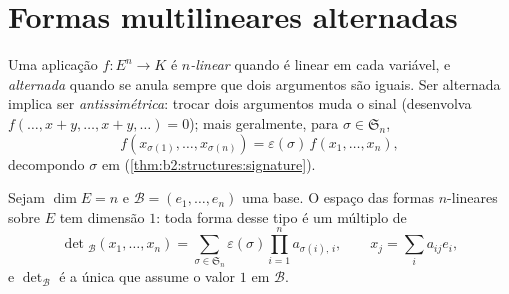 \section{Formas multilineares alternadas}

\begin{definition}\label{def:b2:linalg:alternating}
Uma aplicação $f \colon E^n \to K$ é \emph{$n$-linear} quando é linear em
cada variável, e \emph{alternada} quando
se anula sempre que dois argumentos são iguais. Ser alternada implica ser
\emph{antissimétrica}: trocar dois argumentos muda o sinal
(desenvolva $f(\dots, x + y, \dots, x + y, \dots) = 0$); mais geralmente,
para $\sigma \in \mathfrak{S}_n$,
\[
f(x_{\sigma(1)}, \dots, x_{\sigma(n)}) =
\varepsilon(\sigma)\, f(x_1, \dots, x_n),
\]
decompondo $\sigma$ em 
(\cref{thm:b2:structures:signature}).
\end{definition}

\begin{theorem}\label{thm:b2:linalg:detspace}
Sejam $\dim E = n$ e $\mathcal{B} = (e_1, \dots, e_n)$ uma base. O
espaço das formas $n$-lineares  sobre $E$ tem dimensão $1$:
toda forma desse tipo é um múltiplo de
\[
\det{}_{\mathcal{B}}(x_1, \dots, x_n)
= \sum_{\sigma \in \mathfrak{S}_n} \varepsilon(\sigma)
\prod_{i=1}^{n} a_{\sigma(i),\,i},
\qquad
x_j = \sum_{i} a_{ij} e_i ,
\]
e $\det_{\mathcal{B}}$ é a única que assume o valor $1$ em
$\mathcal{B}$.
\end{theorem}

